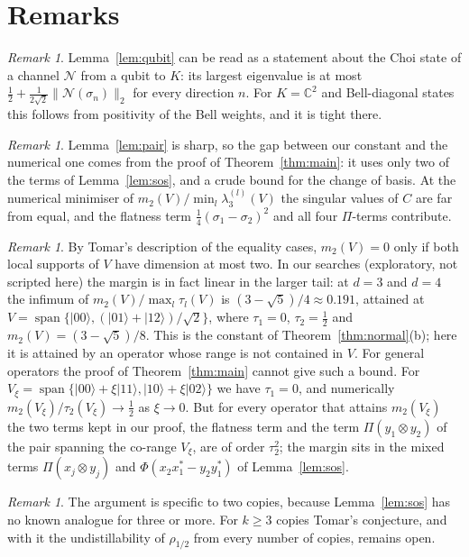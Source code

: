 \documentclass[11pt]{article}
\theoremstyle{remark}
\newtheorem{remark}[theorem]{Remark}
\newcommand{\norm}[1]{\lVert #1\rVert}
\begin{document}
\section{Remarks}

\begin{remark}
Lemma~\ref{lem:qubit} can be read as a statement about the Choi state of a channel $\mathcal N$ from a qubit to $K$:
its largest eigenvalue is at most $\frac12+\frac1{2\sqrt2}\norm{\mathcal N(\sigma_n)}_2$ for every direction $n$. For
$K=\mathbb C^2$ and Bell-diagonal states this follows from positivity of the Bell weights, and it is tight there.
\end{remark}

\begin{remark}
Lemma~\ref{lem:pair} is sharp, so the gap between our constant and the numerical one comes from the proof of
Theorem~\ref{thm:main}: it uses only two of the terms of Lemma~\ref{lem:sos}, and a crude bound for the change of
basis. At the numerical minimiser of $m_2(V)/\min_l\lambda_3^{(l)}(V)$ the singular values of $C$ are far from equal,
and the flatness term $\frac14(\sigma_1-\sigma_2)^2$ and all four $\Pi$-terms contribute.
\end{remark}

\begin{remark}
By Tomar's description of the equality cases, $m_2(V)=0$ only if both local supports of $V$ have dimension at most two.
In our searches (exploratory, not scripted here) the margin is in fact linear in the larger tail: at $d=3$ and $d=4$ the infimum of
$m_2(V)/\max_l\tau_l(V)$ is $(3-\sqrt5)/4\approx0.191$, attained at $V=\operatorname{span}\{|00\rangle,
(|01\rangle+|12\rangle)/\sqrt2\}$, where $\tau_1=0$, $\tau_2=\frac12$ and $m_2(V)=(3-\sqrt5)/8$. This is the constant
of Theorem~\ref{thm:normal}(b); here it is attained by an operator whose range is not contained in $V$. For general
operators the proof of Theorem~\ref{thm:main} cannot give such a bound. For $V_\xi=\operatorname{span}\{|00\rangle+\xi|11\rangle,|10\rangle+\xi|02\rangle\}$ we have
$\tau_1=0$, and numerically $m_2(V_\xi)/\tau_2(V_\xi)\to\frac12$ as $\xi\to0$. But for every operator that attains
$m_2(V_\xi)$ the two terms kept in our proof, the flatness term and the term $\Pi(y_1\otimes y_2)$ of the pair spanning
the co-range $V_\xi$, are of order $\tau_2^2$; the margin sits in the mixed terms $\Pi(x_j\otimes y_j)$ and
$\Phi(x_2x_1^*-y_2y_1^*)$ of Lemma~\ref{lem:sos}.
\end{remark}

\begin{remark}
The argument is specific to two copies, because Lemma~\ref{lem:sos} has no known analogue for three or more. For
$k\ge3$ copies Tomar's conjecture, and with it the undistillability of $\rho_{1/2}$ from every number of copies, remains
open.
\end{remark}
\end{document}
